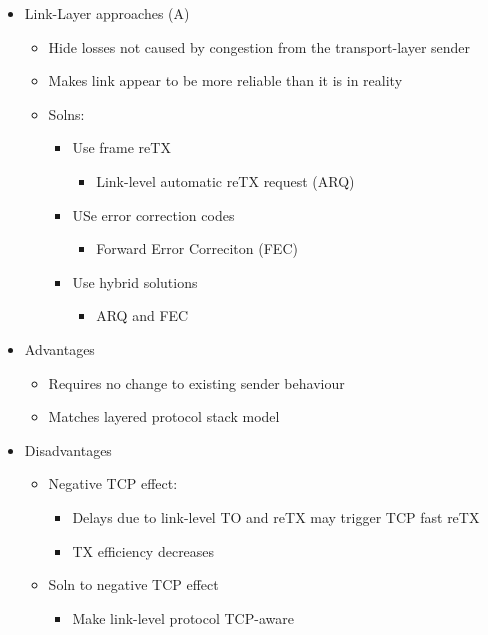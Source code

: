 \begin{itemize}
	\item Link-Layer approaches (A)
	\begin{itemize}
		\item Hide losses not caused by congestion from the
			transport-layer sender
		\item Makes link appear to be more reliable than it is in
			reality
		\item Solns:
		\begin{itemize}
			\item Use frame reTX
			\begin{itemize}
				\item Link-level automatic reTX request (ARQ)
			\end{itemize}
			\item USe error correction codes
				\begin{itemize}
					\item Forward Error Correciton (FEC)
				\end{itemize}
			\item Use hybrid solutions
			\begin{itemize}
				\item ARQ and FEC
			\end{itemize}
		\end{itemize}
	\end{itemize}
	\item Advantages
	\begin{itemize}
		\item Requires no change to existing sender behaviour
		\item Matches layered protocol stack model
	\end{itemize}
	\item Disadvantages
	\begin{itemize}
		\item Negative TCP effect:
		\begin{itemize}
			\item Delays due to link-level TO and reTX may trigger
				TCP fast reTX
			\item TX efficiency decreases
		\end{itemize}
		\item Soln to negative TCP effect
		\begin{itemize}
			\item Make link-level protocol TCP-aware
		\end{itemize}
	\end{itemize}

\end{itemize}
